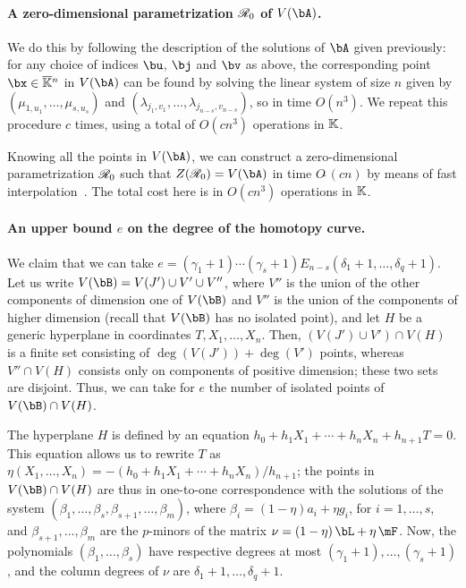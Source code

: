 \documentclass[12pt]{article}
\begin{document}
\paragraph{A zero-dimensional parametrization $\mathscr{R}_0$ of $V(\bA)$.} 
We do this by following the description of the solutions of $\bA$
given previously: for any choice of indices $\bu$, $\bj$ and $\bv$ as
above, the corresponding point $\bx \in \KKbar{}^n$ in $V(\bA)$ can be
found by solving the linear system of size $n$ given by
$(\mu_{1,u_1},\dots,\mu_{s,u_s})$ and
$(\lambda_{j_1,v_1},\dots,\lambda_{j_{n-s},v_{n-s}})$, so in time
$O(n^3)$. We repeat this procedure $c$ times, using a total of $O(c
n^3)$ operations in $\mathbb{K}$.

Knowing all the points in $V(\bA)$, we can construct a
zero-dimensional parametrization $\mathscr{R}_0$ such that
$Z(\scrR_0)=V(\bA)$ in time $O\tilde{~}(c n)$ by means of fast
interpolation~\cite[Chapter~10]{GaGe03}.  The total cost here is in
$O(c n^3)$ operations in $\mathbb{K}$.

\paragraph{An upper bound $e$ on the degree of the homotopy curve.}  We claim that we
can take $e=(\gamma_1+1)\cdots(\gamma_s+1) E_{n-s}(\delta_1+1, \ldots,
\delta_q+1)$.  Let us write $V(\bB)=V(J') \cup V' \cup V''$, where
$V''$ is the union of the other components of dimension one of
$V(\bB)$ and $V''$ is the union of the components of higher dimension
(recall that $V(\bB)$ has no isolated point), and let $H$ be a
generic hyperplane in coordinates $T,X_1,\dots,X_n$. Then, $(V(J')
\cup V') \cap V(H)$ is a finite set consisting of $\deg(V(J')) +
\deg(V')$ points, whereas $V'' \cap V(H)$ consists only on components
of positive dimension; these two sets are disjoint. Thus, we can take
for $e$ the number of isolated points of $V(\bB)\cap V(H)$.

The hyperplane $H$ is defined by an equation
$h_0 + h_1 X_1 + \cdots + h_{n}X_{n} + h_{n+1} T=0$. This equation
allows us to rewrite $T$ as
$\eta(X_1,\dots,X_n)=-(h_0 + h_1 X_1 + \cdots +
h_{n}X_{n})/h_{n+1}$;
the points in $V(\bB)\cap V(H)$ are thus in one-to-one correspondence
with the solutions of the system
$(\beta_1,\dots,\beta_s,\beta_{s+1},\dots,\beta_m)$, where
$\beta_i=(1-\eta) a_i + \eta g_i$, for $i=1,\dots,s$, and
$\beta_{s+1},\dots,\beta_m$ are the $p$-minors of the matrix
${\nu}=(1-\eta)\, \bL + \eta \, \mF $.  Now, the polynomials
$(\beta_1,\dots,\beta_s)$ have respective degrees at most
$(\gamma_1+1),\dots,(\gamma_s+1)$, and the column degrees of ${\nu}$
are $\delta_1+1,\dots,\delta_q+1$.
\end{document}
